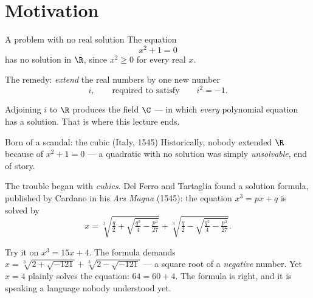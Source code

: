 

\section{Motivation}

\begin{frame}{A problem with no real solution}
The equation
\[
x^2 + 1 = 0
\]
has no solution in $\R$, since $x^2 \geq 0$ for every real $x$.

\pause

The remedy: \emph{extend} the real numbers by one new number
\[
i, \qquad \text{required to satisfy} \qquad i^2 = -1.
\]

\pause

\begin{remark}
Adjoining $i$ to $\R$ produces the field $\C$ — in which \emph{every} polynomial
equation has a solution. That is where this lecture ends.
\end{remark}
\end{frame}

\begin{frame}{Born of a scandal: the cubic (Italy, 1545)}
Historically, nobody extended $\R$ because of $x^2+1=0$ — a quadratic with no
solution was simply \emph{unsolvable}, end of story.

\pause

The trouble began with \emph{cubics}. Del Ferro and Tartaglia found a solution
formula, published by Cardano in his \emph{Ars Magna} (1545): the equation
$x^3 = px + q$ is solved by
\[
x = \sqrt[3]{\tfrac{q}{2} + \sqrt{\tfrac{q^2}{4} - \tfrac{p^3}{27}}}
  + \sqrt[3]{\tfrac{q}{2} - \sqrt{\tfrac{q^2}{4} - \tfrac{p^3}{27}}}.
\]

\pause

\begin{warning}
Try it on $x^3 = 15x + 4$. The formula demands
$x = \sqrt[3]{2 + \sqrt{-121}} + \sqrt[3]{2 - \sqrt{-121}}$ — a square root of
a \emph{negative} number. Yet $x = 4$ plainly solves the equation:
$64 = 60 + 4$. The formula is right, and it is speaking a language nobody
understood yet.
\end{warning}
\end{frame}


